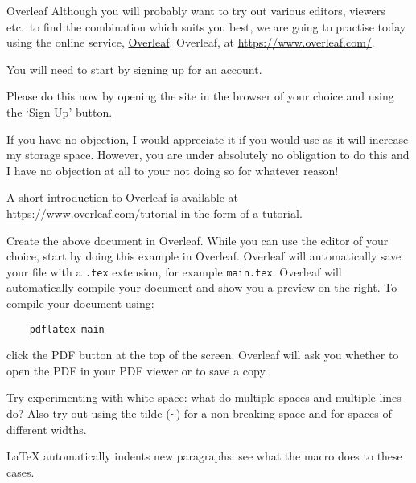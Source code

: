 \begin{frame}{Overleaf}
  Although you will probably want to try out various editors, viewers etc.\ to find the combination which suits you best, we are going to practise today using the online service,
  {%
    \href{https://www.overleaf.com/}{Overleaf}.
  }
  {%
    Overleaf, at \href{https://www.overleaf.com/}{https://www.overleaf.com/}.
  }

  You will need to start by signing up for an account.

  Please do this now by opening the site in the browser of your choice and using the ‘Sign Up’ button.

  {
    If you have no objection, I would appreciate it if you would use 
    as it will increase my storage space.
    However, you are under absolutely no obligation to do this and I have no objection at all to your not doing so for whatever reason!

    A short introduction to Overleaf is available at \href{https://www.overleaf.com/tutorial}{https://www.overleaf.com/tutorial} in the form of a tutorial.
  }
\end{frame}


\begin{exercise}
  Create the above document in Overleaf.
  While you can use the editor of your choice, start by doing this example in Overleaf.
  Overleaf will automatically save your file with a \texttt{.tex} extension, for example \texttt{main.tex}.
  Overleaf will automatically compile your document and show you a preview on the right.
  To compile your document using:
  \begin{verbatim}
	pdflatex main
  \end{verbatim}
  click the PDF button at the top of the screen.
  Overleaf will ask you whether to open the PDF in your PDF viewer or to save a copy.

  Try experimenting with white space: what do multiple spaces and multiple lines do?
  Also try out using the tilde (\verb"~") for a non-breaking space and \cs{,} for spaces of different widths.

  \LaTeX{} automatically indents new paragraphs: see what the  macro does to these cases.
\end{exercise}

